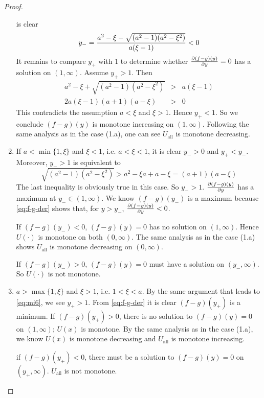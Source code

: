 \begin{subappendices}
\begin{proof}
\begin{enumerate}
    is clear
    \[
    y_- = {
      a^2 - \xi - \sqrt{(a^2 - 1) (a^2 - \xi^2)}
      \over
      a (\xi - 1)
    } < 0
    \]
    It remains to compare $y_+$ with $1$ to determine whether
    ${\partial (f -g)(y) \over \partial y} = 0$ has a solution on $(1, \infty)$.
    Assume $y_+ > 1$. Then
    \begin{eqnarray}
      a^2 - \xi + \sqrt{(a^2 - 1) (a^2 - \xi^2)} &>& a (\xi - 1)
      \nonumber \\
      2 a (\xi - 1) (a + 1) (a - \xi) &>& 0 \label{eq:mi6}
    \end{eqnarray}
    This contradicts the assumption $a < \xi$ and $\xi > 1$. Hence
    $y_+ < 1$. So we conclude $(f - g)(y)$ is monotone increasing
    on $(1, \infty)$. Following the same analysis as in the case
    (1.a), one can see $U_{\text{all}}$ is monotone decreasing.

  \item If $a < \min\{1, \xi\}$ and $\xi < 1$, i.e. $a < \xi < 1$, it
    is clear $y_- > 0$ and $y_+ < y_-$. Moreover, $y_- > 1$ is equivalent
    to
    \[
    \sqrt{(a^2 - 1) (a^2 - \xi^2)} > a^2 - \xi a + a - \xi
    = (a + 1) (a - \xi)
    \]
    The last inequality is obviously true in this case. So $y_- >
    1$. ${\partial (f-g)(y) \over \partial y}$ has a maximum at
    $y_- \in (1, \infty)$. We know $(f - g)(y_-)$ is a maximum because
    \eqref{eq:f-g-der} shows that, for $y > y_-$,
    ${\partial (f-g)(y) \over \partial y} < 0$.

    If $(f-g)(y_-) < 0$, $(f-g)(y) = 0$ has no solution on $(1,
    \infty)$. Hence $U(\cdot)$ is monotone on both $(0, \infty)$.
    The same analysis as in the case (1.a) shows $U_{\text{all}}$
    is monotone decreasing on $(0, \infty)$.

    If $(f-g)(y_-) > 0$, $(f-g)(y) = 0$ must have a solution on $(y_-,
    \infty)$. So $U(\cdot)$ is not monotone.

    \item $a > \max\{1, \xi\}$ and $\xi > 1$, i.e. $1 < \xi < a$. By
      the same argument that leads to \eqref{eq:mi6}, we see
      $y_+ > 1$. From \eqref{eq:f-g-der} it is clear $(f-g)(y_+)$ is a
      minimum. If $(f-g)(y_+) > 0$, there is no solution to
      $(f-g)(y) = 0$ on $(1, \infty)$; $U(x)$ is monotone. By the
      same analysis as in the case (1.a), we know $U(x)$ is
      monotone decreasing and $U_{\text{all}}$ is monotone increasing.
      
      if $(f-g)(y_+) < 0$, there must be a solution to $(f-g)(y) = 0$
      on $(y_+, \infty)$. $U_{\text{all}}$ is not monotone.
  \end{enumerate}
\end{proof}

\ifx\phdthesis\undefined
\else
\end{subappendices}
\fi
